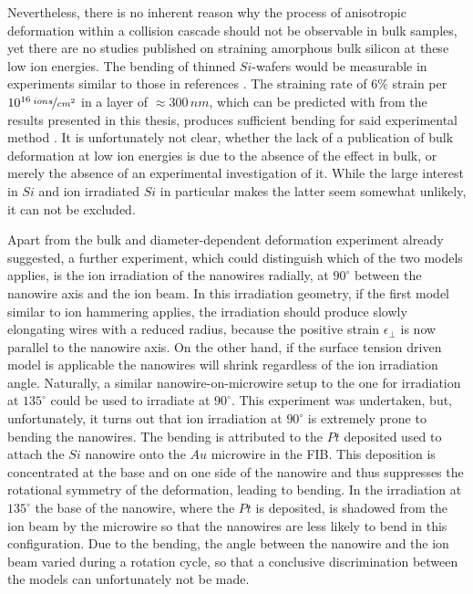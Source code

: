 \begin{Figure}[h]
Nevertheless, there is no inherent reason why the process of anisotropic deformation within a collision cascade should not be observable in bulk samples, yet there are no studies published on straining amorphous bulk silicon at these low ion energies. The bending of thinned $Si$-wafers would be measurable in experiments similar to those in references \cite{volkert_stress_1991,massl_stress_2008}. The straining rate of $6\%$ strain per $10^{16}\,\nicefrac{ions}{cm^2}$ in a layer of $\approx 300\,nm$, which can be predicted with from the results presented in this thesis, produces sufficient bending for said experimental method \cite{flinn_measurement_1987}. It is unfortunately not clear, whether the lack of a publication of bulk deformation at low ion energies is due to the absence of the effect in bulk, or merely the absence of an experimental investigation of it. While the large interest in $Si$ and ion irradiated $Si$ in particular makes the latter seem somewhat unlikely, it can not be excluded.

Apart from the bulk and diameter-dependent deformation experiment already suggested, a further experiment, which could distinguish which of the two models applies, is the ion irradiation of the nanowires radially, at $90^\circ$ between the nanowire axis and the ion beam. In this irradiation geometry, if the first model similar to ion hammering applies, the irradiation should produce slowly elongating wires with a reduced radius, because the positive strain $\epsilon_{\perp}$ is now parallel to the nanowire axis. On the other hand, if the surface tension driven model is applicable the nanowires will shrink regardless of the ion irradiation angle. Naturally, a similar nanowire-on-microwire setup to the one for irradiation at $135^\circ$ could be used to irradiate at $90^\circ$. This experiment was undertaken, but, unfortunately, it turns out that ion irradiation at $90^\circ$ is extremely prone to bending the nanowires. The bending is attributed to the $Pt$ deposited used to attach the $Si$ nanowire onto the $Au$ microwire in the FIB. This deposition is concentrated at the base and on one side of the nanowire and thus suppresses the rotational symmetry of the deformation, leading to bending. In the irradiation at $135^\circ$ the base of the nanowire, where the $Pt$ is deposited, is shadowed from the ion beam by the microwire so that the nanowires are less likely to bend in this configuration. Due to the bending, the angle between the nanowire and the ion beam varied during a rotation cycle, so that a conclusive discrimination between the models can unfortunately not be made. 


\end{Figure}
